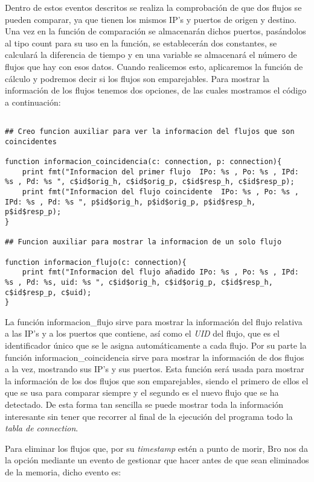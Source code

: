 \noindent Dentro de estos eventos descritos se realiza la comprobación de que dos 
flujos se pueden comparar, ya que tienen los mismos IP’s y puertos de 
origen y destino. Una vez en la función de comparación se almacenarán 
dichos puertos, pasándolos al tipo count para su uso en la función, se 
establecerán dos constantes, se calculará la diferencia de tiempo y en 
una variable se almacenará el número de flujos que hay con esos datos. 
Cuando realicemos esto, aplicaremos la función de cálculo y podremos 
decir si los flujos son emparejables.
\intro
Para mostrar la información de los flujos tenemos dos opciones, de las 
cuales mostramos el código a continuación:
\intro
\begin{lstlisting}[style=CodigoC]

## Creo funcion auxiliar para ver la informacion del flujos que son coincidentes

function informacion_coincidencia(c: connection, p: connection){
    print fmt("Informacion del primer flujo  IPo: %s , Po: %s , IPd: %s , Pd: %s ", c$id$orig_h, c$id$orig_p, c$id$resp_h, c$id$resp_p);
    print fmt("Informacion del flujo coincidente  IPo: %s , Po: %s , IPd: %s , Pd: %s ", p$id$orig_h, p$id$orig_p, p$id$resp_h, p$id$resp_p);
}

## Funcion auxiliar para mostrar la informacion de un solo flujo

function informacion_flujo(c: connection){
    print fmt("Informacion del flujo añadido IPo: %s , Po: %s , IPd: %s , Pd: %s, uid: %s ", c$id$orig_h, c$id$orig_p, c$id$resp_h, c$id$resp_p, c$uid);
}

\end{lstlisting}

\noindent La función informacion\_flujo sirve para mostrar la información del flujo 
relativa a las IP’s y a los puertos que contiene, así como el \textit{UID} 
del flujo, que es el identificador único que se le asigna automáticamente 
a cada flujo. 
\intro
Por su parte la función informacion\_coincidencia sirve para mostrar la 
información de dos flujos a la vez, mostrando sus IP’s y sus puertos. 
Esta función será usada para mostrar la información de los dos flujos que 
son emparejables, siendo el primero de ellos el que se usa para comparar siempre 
y el segundo es el nuevo flujo que se ha detectado. De esta forma tan sencilla 
se puede mostrar toda la información interesante sin tener que recorrer al final de 
la ejecución del programa todo la \textit{tabla de connection}.

\intro
Para eliminar los flujos que, por su \textit{timestamp} estén a punto de morir, Bro nos 
da la opción mediante un evento de gestionar que hacer antes de que sean eliminados 
de la memoria, dicho evento es: 

